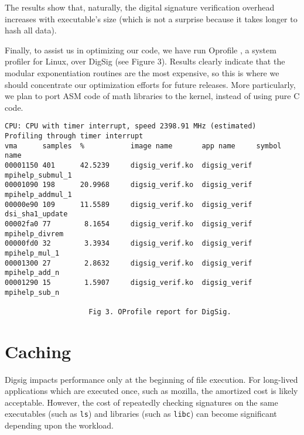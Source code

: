 \documentclass{article}
\begin{document}

The results show that, naturally, the digital signature verification
overhead increases with executable's size (which is not a surprise
because it takes longer to hash all data).

Finally, to assist us in optimizing our code, we have run Oprofile
\cite{OProfile}, a system profiler for Linux, over DigSig (see Figure 3). Results
clearly indicate that the modular exponentiation routines are the most
expensive, so this is where we should concentrate our optimization
efforts for future releases. More particularly, we plan to port ASM
code of math libraries to the kernel, instead of using pure C code.

\begin{verbatim} 
CPU: CPU with timer interrupt, speed 2398.91 MHz (estimated)
Profiling through timer interrupt
vma      samples  %           image name       app name     symbol name
00001150 401      42.5239     digsig_verif.ko  digsig_verif mpihelp_submul_1
00001090 198      20.9968     digsig_verif.ko  digsig_verif mpihelp_addmul_1
00000e90 109      11.5589     digsig_verif.ko  digsig_verif dsi_sha1_update
00002fa0 77        8.1654     digsig_verif.ko  digsig_verif mpihelp_divrem
00000fd0 32        3.3934     digsig_verif.ko  digsig_verif mpihelp_mul_1
00001300 27        2.8632     digsig_verif.ko  digsig_verif mpihelp_add_n
00001290 15        1.5907     digsig_verif.ko  digsig_verif mpihelp_sub_n

                    Fig 3. OProfile report for DigSig. 
\end{verbatim} 

\section{Caching}

Digsig impacts performance only at the beginning of file execution.  For
long-lived applications which are executed once, such as mozilla, the
amortized cost is likely acceptable.  However, the cost of repeatedly
checking signatures on the same executables (such as {\tt ls}) and
libraries (such as {\tt libc}) can become significant depending upon
the workload.
\end{document}
